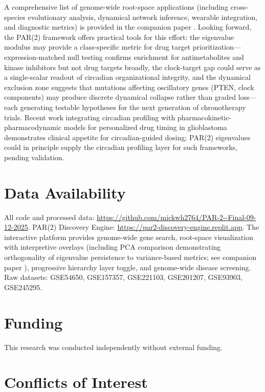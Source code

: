 \documentclass[11pt,letterpaper]{article}
\begin{document}
\noindent A comprehensive list of genome-wide root-space applications (including cross-species evolutionary analysis, dynamical network inference, wearable integration, and diagnostic metrics) is provided in the companion paper \citep{whiteside2026paper1}. Looking forward, the PAR(2) framework offers practical tools for this effort: the eigenvalue modulus may provide a class-specific metric for drug target prioritization---expression-matched null testing confirms enrichment for antimetabolites and kinase inhibitors but not drug targets broadly, the clock-target gap could serve as a single-scalar readout of circadian organizational integrity, and the dynamical exclusion zone suggests that mutations affecting oscillatory genes (PTEN, clock components) may produce discrete dynamical collapse rather than graded loss---each generating testable hypotheses for the next generation of chronotherapy trials. Recent work integrating circadian profiling with pharmacokinetic-pharmacodynamic models for personalized drug timing in glioblastoma \citep{fujimoto2025} demonstrates clinical appetite for circadian-guided dosing; PAR(2) eigenvalues could in principle supply the circadian profiling layer for such frameworks, pending validation.

\section*{Data Availability}

All code and processed data: \url{https://github.com/mickwh2764/PAR-2--Final-09-12-2025}. PAR(2) Discovery Engine: \url{https://par2-discovery-engine.replit.app}. The interactive platform provides genome-wide gene search, root-space visualization with interpretive overlays (including PCA comparison demonstrating orthogonality of eigenvalue persistence to variance-based metrics; see companion paper \citep{whiteside2026paper1}), progressive hierarchy layer toggle, and genome-wide disease screening. Raw datasets: GSE54650, GSE157357, GSE221103, GSE201207, GSE93903, GSE245295.

\section*{Funding}

This research was conducted independently without external funding.

\section*{Conflicts of Interest}
\end{document}
